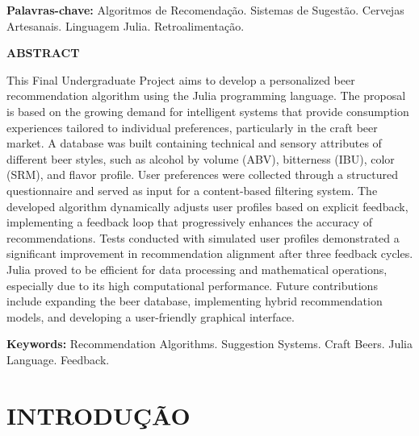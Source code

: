 \documentclass[12pt,a4paper]{article}
\begin{document}
\vspace{1cm}

\textbf{Palavras-chave:} Algoritmos de Recomendação. Sistemas de Sugestão. Cervejas Artesanais. Linguagem Julia. Retroalimentação.

\newpage
\begin{center}
\Large
\textbf{ABSTRACT}
\end{center}

\vspace{1cm}

This Final Undergraduate Project aims to develop a personalized beer recommendation algorithm using the Julia programming language. The proposal is based on the growing demand for intelligent systems that provide consumption experiences tailored to individual preferences, particularly in the craft beer market. A database was built containing technical and sensory attributes of different beer styles, such as alcohol by volume (ABV), bitterness (IBU), color (SRM), and flavor profile. User preferences were collected through a structured questionnaire and served as input for a content-based filtering system. The developed algorithm dynamically adjusts user profiles based on explicit feedback, implementing a feedback loop that progressively enhances the accuracy of recommendations. Tests conducted with simulated user profiles demonstrated a significant improvement in recommendation alignment after three feedback cycles. Julia proved to be efficient for data processing and mathematical operations, especially due to its high computational performance. Future contributions include expanding the beer database, implementing hybrid recommendation models, and developing a user-friendly graphical interface.

\vspace{1cm}

\textbf{Keywords:} Recommendation Algorithms. Suggestion Systems. Craft Beers. Julia Language. Feedback.

\newpage
\listoffigures

\newpage
\listoftables

\newpage
\tableofcontents

\newpage
\section{INTRODUÇÃO}
\end{document}
